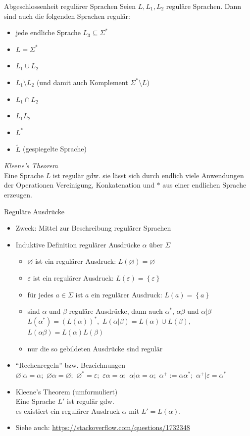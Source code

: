 \begin{frame}{Abgeschlossenheit regulärer Sprachen}
	Seien $L, L_1, L_2$ reguläre Sprachen. Dann sind auch die folgenden Sprachen regulär:
	\begin{itemize}
		\item jede endliche Sprache $L_{3} \subseteq \Sigma^*$
		\item $L = \Sigma^*$
		\item $L_1 \cup L_2$
		\item $L_1 \setminus L_2$ (und damit auch Komplement $\Sigma^* \setminus L$)
		\item $L_1 \cap L_2$
		\item $L_1L_2$
		\item $L^*$
		\item $\tilde{L}$ (gespiegelte Sprache)
	\end{itemize}
	\emph{Kleene's Theorem}\\
		Eine Sprache $L$ ist regulär gdw. sie lässt sich durch endlich viele
		Anwendungen der Operationen Vereinigung, Konkatenation und $*$ aus
		einer endlichen Sprache erzeugen.
\end{frame}

\begin{frame}{Reguläre Ausdrücke}
	\begin{itemize}
		\item Zweck: Mittel zur Beschreibung regulärer Sprachen
		\item Induktive Definition regulärer Ausdrücke $\alpha$ über $\Sigma$
		\begin{itemize}
			\item $\varnothing $ ist ein regulärer Ausdruck: $L(\varnothing)=\varnothing$
			\item $\varepsilon$ ist ein regulärer Ausdruck: $L(\varepsilon)=\left\{\varepsilon\right\}$
			\item für jedes $a \in \Sigma$ ist $a$ ein regulärer Ausdruck: $L(a)=\left\{a\right\}$
			\item sind $\alpha$ und $\beta$ reguläre Ausdrücke, dann auch $\alpha^*$, $\alpha\beta$ und $\alpha | \beta$\\
			\quad $L(\alpha^*)=(L(\alpha))^*,$ $L(\alpha|\beta)=L(\alpha)\cup L(\beta),$ $L(\alpha\beta)=L(\alpha)L(\beta)$
			\item nur die so gebildeten Ausdrücke sind regulär
		\end{itemize}
		\item "`Rechenregeln"' bzw. Bezeichnungen\\
		\quad $\varnothing|\alpha=\alpha;$ $\varnothing\alpha=\varnothing;$ $\varnothing^*=\varepsilon;$ $\varepsilon\alpha=\alpha;$ $\alpha|\alpha=\alpha;$ $\alpha^+:=\alpha\alpha^*;$ $\alpha^+|\varepsilon=\alpha^*$
		\item Kleene's Theorem (umformuliert)\\
		\quad Eine Sprache $L'$ ist regulär gdw.\\
		\quad es existiert ein regulärer Ausdruck $\alpha$ mit $L'=L(\alpha)$.
		\item Siehe auch: \url{https://stackoverflow.com/questions/1732348}
	\end{itemize}
\end{frame}

